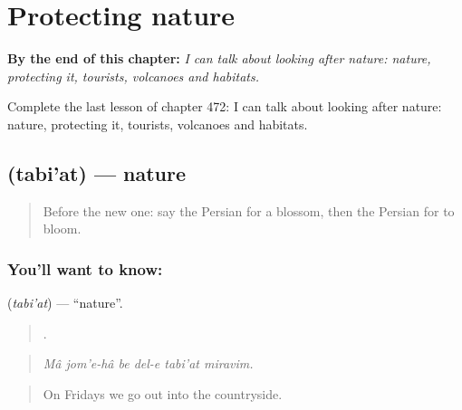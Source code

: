 
\chapter{Protecting nature}
\label{ch:fa-protecting-nature}

\begin{chapteropening}
\textbf{By the end of this chapter:} \emph{I can talk about looking after nature: nature, protecting it, tourists, volcanoes and habitats.}

Complete the last lesson of chapter 472: I can talk about looking after nature: nature, protecting it, tourists, volcanoes and habitats.
\end{chapteropening}

\section[\texorpdfstring{\fa{طبیعت} (tabi'at)}{طبیعت (tabi'at)}]{ (tabi'at) — nature}

\label{lesson:FA-C472-tabiat}



\begin{quote}
Before the new one: say the Persian for a blossom, then the Persian for to bloom.
\end{quote}

\subsection*{You'll want to know: }
\textbf{} (\emph{tabi'at}) — \textquotedblleft{}nature\textquotedblright{}.

\begin{quote}
      .
\end{quote}

\begin{quote}
\emph{Mâ jom'e-hâ be del-e tabi'at miravim.}
\end{quote}

\begin{quote}
On Fridays we go out into the countryside.
\end{quote}


